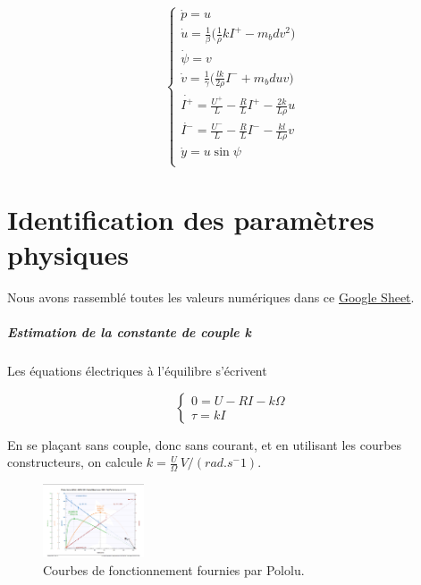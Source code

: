 \documentclass{report}
\begin{document}
\begin{equation*}
    \begin{cases}
        \dot{p} = u \\
        \dot{u} = \frac{1}{\beta}\big( \frac{1}{\rho}kI^{+} - m_bdv^2 \big) \\
        \dot{\psi} = v \\
        \dot{v} = \frac{1}{\gamma}\big( \frac{lk}{2\rho}I^{-} + m_bduv \big) \\
        \dot{I^{+}} = \frac{U^{+}}{L} - \frac{R}{L}I^{+} - \frac{2k}{L\rho}u \\
        \dot{I^{-}} = \frac{U^{-}}{L} - \frac{R}{L}I^{-} - \frac{kl}{L\rho}v \\
        \dot{y} = u\sin\psi \\
    \end{cases}
\end{equation*}



\chapter{Identification des paramètres physiques}

Nous avons rassemblé toutes les valeurs numériques dans ce 
\href{https://docs.google.com/spreadsheets/d/1PVCPAeFXgacQK3YaMxcYYtDlWB_0VT0cpRnJDznpAQc/edit?pli=1#gid=0
}{Google Sheet}.

\paragraph{Estimation de la constante de couple k}

Les équations électriques à l'équilibre s'écrivent

\begin{equation*}
    \begin{cases}
        0 = U - RI - k\Omega \\
        \tau = kI       
    \end{cases}
\end{equation*}

En se plaçant sans couple, donc sans courant, et en utilisant les courbes constructeurs, on calcule
$k=\frac{U}{\Omega} \, V/(rad.s^-1)$.

\begin{figure}[h]  %
    \centering
    \includegraphics[width=3cm]{figures/courbes-construc.png}
    \caption{Courbes de fonctionnement fournies par Pololu.}
\end{figure}
\end{document}
